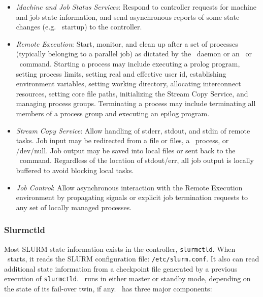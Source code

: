 \begin{itemize}
\item {\em Machine and Job Status Services}:  Respond to controller 
requests for machine and job state information, and send asynchronous 
reports of some state changes (e.g. \slurmd\ startup) to the controller.

\item {\em Remote Execution}: Start, monitor, and clean up after a set
of processes (typically belonging to a parallel job) as dictated by the
\slurmctld\ daemon or an \srun\ or \scancel\ command. Starting a process may
include executing a prolog program, setting process limits, setting real
and effective user id, establishing environment variables, setting working
directory, allocating interconnect resources, setting core file paths,
initializing the Stream Copy Service, and managing
process groups. Terminating a process may include terminating all members
of a process group and executing an epilog program.

\item {\em Stream Copy Service}: Allow handling of stderr, stdout, and
stdin of remote tasks. Job input may be redirected from a file or files, a
\srun\ process, or /dev/null.  Job output may be saved into local files or
sent back to the \srun\ command. Regardless of the location of stdout/err,
all job output is locally buffered to avoid blocking local tasks.

\item {\em Job Control}: Allow asynchronous interaction with the
Remote Execution environment by propagating signals or explicit job
termination requests to any set of locally managed processes.

\end{itemize}

\subsubsection{Slurmctld}

Most SLURM state information exists in the controller, {\tt slurmctld}.
When \slurmctld\ starts, it reads the SLURM configuration file: 
{\tt /etc/slurm.conf}.  It also can read additional state information
from a checkpoint file generated by a previous execution of {\tt slurmctld}.
\slurmctld\ runs in either master or standby mode, depending on the
state of its fail-over twin, if any.
\slurmctld\ has three major components:

